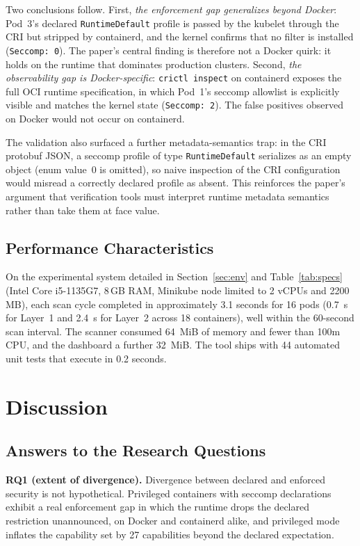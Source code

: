 \documentclass[conference]{IEEEtran}
\begin{document}
Two conclusions follow. First, \emph{the enforcement gap generalizes beyond Docker}: Pod~3's declared \texttt{RuntimeDefault} profile is passed by the kubelet through the CRI but stripped by containerd, and the kernel confirms that no filter is installed (\texttt{Seccomp:~0}). The paper's central finding is therefore not a Docker quirk: it holds on the runtime that dominates production clusters. Second, \emph{the observability gap is Docker-specific}: \texttt{crictl inspect} on containerd exposes the full OCI runtime specification, in which Pod~1's seccomp allowlist is explicitly visible and matches the kernel state (\texttt{Seccomp:~2}). The false positives observed on Docker would not occur on containerd.

The validation also surfaced a further metadata-semantics trap: in the CRI protobuf JSON, a seccomp profile of type \texttt{RuntimeDefault} serializes as an empty object (enum value~0 is omitted), so naive inspection of the CRI configuration would misread a correctly declared profile as absent. This reinforces the paper's argument that verification tools must interpret runtime metadata semantics rather than take them at face value.

\subsection{Performance Characteristics}

On the experimental system detailed in Section~\ref{sec:env} and Table~\ref{tab:specs} (Intel Core i5-1135G7, 8\,GB RAM, Minikube node limited to 2 vCPUs and 2200\,MB), each scan cycle completed in approximately 3.1 seconds for 16 pods (0.7~s for Layer~1 and 2.4~s for Layer~2 across 18 containers), well within the 60-second scan interval. The scanner consumed 64~MiB of memory and fewer than 100m CPU, and the dashboard a further 32~MiB. The tool ships with 44 automated unit tests that execute in 0.2 seconds.

\section{Discussion}

\subsection{Answers to the Research Questions}

\textbf{RQ1 (extent of divergence).} Divergence between declared and enforced security is not hypothetical. Privileged containers with seccomp declarations exhibit a real enforcement gap in which the runtime drops the declared restriction unannounced, on Docker and containerd alike, and privileged mode inflates the capability set by 27 capabilities beyond the declared expectation.
\end{document}
